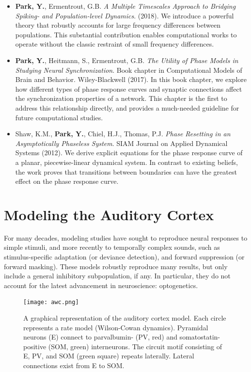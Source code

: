 \documentclass[a4paper,11pt]{article}
\begin{document}
\begin{itemize}
 \item \textbf{Park, Y.}, Ermentrout, G.B. \textit{A Multiple Timescales Approach to Bridging Spiking- and Population-level Dynamics}. (2018). We introduce a powerful theory that robustly accounts for large frequency differences between populations. This substantial contribution enables computational works to operate without the classic restraint of small frequency differences.
 
 \item \textbf{Park, Y.}, Heitmann, S., Ermentrout, G.B. \textit{The Utility of Phase Models in Studying Neural Synchronization}. Book chapter in Computational Models of Brain and Behavior. Wiley-Blackwell (2017). In this book chapter, we explore how different types of phase response curves and synaptic connections affect the synchronization properties of a network. This chapter is the first to address this relationship directly, and provides a much-needed guideline for future computational studies.
 
 \item Shaw, K.M., \textbf{Park, Y.}, Chiel, H.J., Thomas, P.J. \textit{Phase Resetting in an Asymptotically Phaseless System}. SIAM Journal on Applied Dynamical Systems (2012). We derive explicit equations for the phase response curve of a planar, piecewise-linear dynamical system. In contrast to existing beliefs, the work proves that transitions between boundaries can have the greatest effect on the phase response curve.

\end{itemize}



\section{Modeling the Auditory Cortex}
For many decades, modeling studies have sought to reproduce neural responses to simple stimuli, and more recently to temporally complex sounds, such as stimulus-specific adaptation (or deviance detection), and forward suppression (or forward masking). These models robustly reproduce many results, but only include a general inhibitory subpopulation, if any. In particular, they do not account for the latest advancement in neuroscience: optogenetics.

\begin{figure}
\centering
 \texttt{[image: awc.png]}
 \caption{A graphical representation of the auditory cortex model. Each circle represents a rate model (Wilson-Cowan dynamics). Pyramidal neurons (E) connect to parvalbumin- (PV, red) and somatostatin-positive (SOM, green) interneurons. The circuit motif consisting of E, PV, and SOM (green square) repeats laterally. Lateral connections exist from E to SOM.}
\end{figure}
\end{document}
